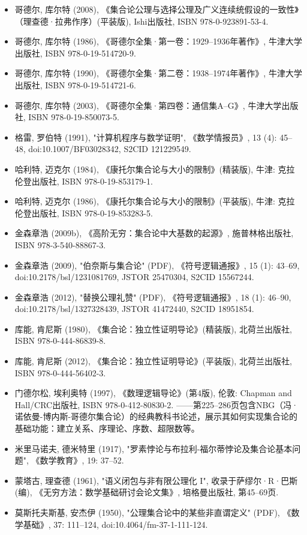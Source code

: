 \begin{itemize}
\item 哥德尔, 库尔特 (2008), 《集合论公理与选择公理及广义连续统假设的一致性》（理查德·拉弗作序）(平装版), Ishi出版社, ISBN 978-0-923891-53-4.  
\item 哥德尔, 库尔特 (1986), 《哥德尔全集·第一卷：1929–1936年著作》, 牛津大学出版社, ISBN 978-0-19-514720-9.  
\item 哥德尔, 库尔特 (1990), 《哥德尔全集·第二卷：1938–1974年著作》, 牛津大学出版社, ISBN 978-0-19-514721-6.  
\item 哥德尔, 库尔特 (2003), 《哥德尔全集·第四卷：通信集A–G》, 牛津大学出版社, ISBN 978-0-19-850073-5.  
\item 格雷, 罗伯特 (1991), "计算机程序与数学证明", 《数学情报员》, 13 (4): 45–48, doi:10.1007/BF03028342, S2CID 121229549.  
\item 哈利特, 迈克尔 (1984), 《康托尔集合论与大小的限制》(精装版), 牛津: 克拉伦登出版社, ISBN 978-0-19-853179-1.  
\item 哈利特, 迈克尔 (1986), 《康托尔集合论与大小的限制》(平装版), 牛津: 克拉伦登出版社, ISBN 978-0-19-853283-5. 
\item 金森章浩 (2009b), 《高阶无穷：集合论中大基数的起源》, 施普林格出版社, ISBN 978-3-540-88867-3.  
\item 金森章浩 (2009), "伯奈斯与集合论" (PDF), 《符号逻辑通报》, 15 (1): 43–69, doi:10.2178/bsl/1231081769, JSTOR 25470304, S2CID 15567244.  
\item 金森章浩 (2012), "替换公理礼赞" (PDF), 《符号逻辑通报》, 18 (1): 46–90, doi:10.2178/bsl/1327328439, JSTOR 41472440, S2CID 18951854.  
\item 库能, 肯尼斯 (1980), 《集合论：独立性证明导论》(精装版), 北荷兰出版社, ISBN 978-0-444-86839-8.  
\item 库能, 肯尼斯 (2012), 《集合论：独立性证明导论》(平装版), 北荷兰出版社, ISBN 978-0-444-56402-3.  
\item 门德尔松, 埃利奥特 (1997), 《数理逻辑导论》(第4版), 伦敦: Chapman and Hall/CRC出版社, ISBN 978-0-412-80830-2. ——第225–286页包含NBG（冯·诺依曼-博内斯-哥德尔集合论）的经典教科书论述，展示其如何实现集合论的基础功能：建立关系、序理论、序数、超限数等。  
\item 米里马诺夫, 德米特里 (1917), "罗素悖论与布拉利-福尔蒂悖论及集合论基本问题", 《数学教育》, 19: 37–52.  
\item 蒙塔古, 理查德 (1961), "语义闭包与非有限公理化 I", 收录于萨缪尔·R·巴斯 (编), 《无穷方法：数学基础研讨会论文集》, 培格曼出版社, 第45–69页.  
\item 莫斯托夫斯基, 安杰伊 (1950), "公理集合论中的某些非直谓定义" (PDF), 《数学基础》, 37: 111–124, doi:10.4064/fm-37-1-111-124.  

\end{itemize}
